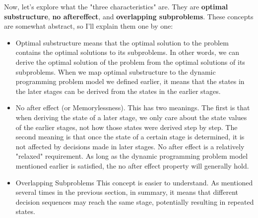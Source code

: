 \documentclass[a4paper,11pt,twoside]{book}
\begin{document}
	\par Now, let's explore what the "three characteristics" are. They are \textbf{optimal substructure}, \textbf{no aftereffect}, and \textbf{overlapping subproblems}. These concepts are somewhat abstract, so I'll explain them one by one:
\begin{itemize}
	\item Optimal substructure means that the optimal solution to the problem contains the optimal solutions to its subproblems. In other words, we can derive the optimal solution of the problem from the optimal solutions of its subproblems. When we map optimal substructure to the dynamic programming problem model we defined earlier, it means that the states in the later stages can be derived from the states in the earlier stages.
	
	\item No after effect (or Memorylessness). 
	This has two meanings. The first is that when deriving the state of a later stage, we only care about the state values of the earlier stages, not how those states were derived step by step. The second meaning is that once the state of a certain stage is determined, it is not affected by decisions made in later stages. No after effect is a relatively "relaxed" requirement. As long as the dynamic programming problem model mentioned earlier is satisfied, the no after effect property will generally hold.
	
	\item Overlapping Subproblems
	This concept is easier to understand. As mentioned several times in the previous section, in summary, it means that different decision sequences may reach the same stage, potentially resulting in repeated states.
\end{itemize}	
		
\end{document}
